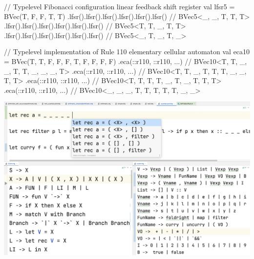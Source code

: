 \documentclass[portrait,a0b,final,a4resizeable]{a0poster}
\def\jointspacing{\vspace{0.3in}}
\begin{document}
\begin{poster}
\begin{multicols}{2}
\begin{minipage}[c]{0.90\columnwidth}
\begin{kotlinlisting}
// Typelevel Fibonacci configuration linear feedback shift register
val lfsr5 = BVec(T, F, F, T, T)
   .lfsr().lfsr().lfsr().lfsr().lfsr().lfsr() // BVec5<_, _, T, T, T>
   .lfsr().lfsr().lfsr().lfsr().lfsr().lfsr() // BVec5<T, T, _, T, T>
   .lfsr().lfsr().lfsr().lfsr().lfsr().lfsr() // BVec5<_, T, _, T, _>

// Typelevel implementation of Rule 110 elementary cellular automaton
val eca10 = BVec(T, T, F, F, F, T, F, F, F, F)
   .eca(::r110, ::r110, ...)  // BVec10<T, T, _, _, T, T, _, _, _, T>
   .eca(::r110, ::r110, ...)  // BVec10<T, T, _, T, T, T, _, _, T, T>
   .eca(::r110, ::r110, ...)  // BVec10<T, T, T, T, _, T, _, T, T, T>
   .eca(::r110, ::r110, ...)  // BVec10<_, _, _, T, T, T, T, T, _, _>
\end{kotlinlisting}
      \end{minipage}

      \jointspacing


      \null\hspace*{1.8cm}\begin{minipage}[c]{0.90\columnwidth}
          \href{https://github.com/breandan/tidyparse}{\includegraphics[width=\textwidth]{../figures/tidyparse.png}}
      \end{minipage}

      \jointspacing

    \end{multicols}


\end{poster}
\end{document}
